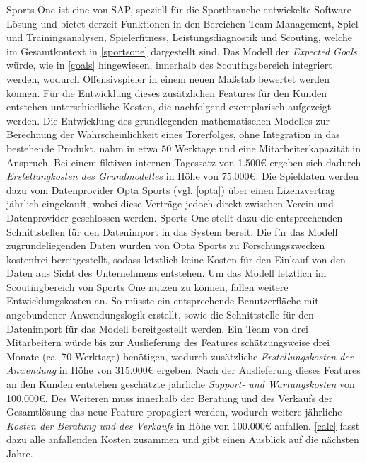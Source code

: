 Sports One ist eine von SAP, speziell für die Sportbranche entwickelte Software-Lösung und bietet derzeit Funktionen in den Bereichen Team Management, Spiel- und Trainingsanalysen, Spielerfitness, Leistungsdiagnostik und Scouting, welche im Gesamtkontext in \vref{sportsone} dargestellt sind. Das Modell der \textit{Expected Goals} würde, wie in \vref{goals} hingewiesen, innerhalb des Scoutingsbereich integriert werden, wodurch Offensivspieler in einem neuen Maßstab bewertet werden können. Für die Entwicklung dieses zusätzlichen Features für den Kunden entstehen unterschiedliche Kosten, die nachfolgend exemplarisch aufgezeigt werden. Die Entwicklung des grundlegenden mathematischen Modelles zur Berechnung der Wahrscheinlichkeit eines Torerfolges, ohne Integration in das bestehende Produkt, nahm in etwa 50 Werktage und eine Mitarbeiterkapazität in Anspruch. Bei einem fiktiven internen Tagessatz von \textsf{1.500\euro} ergeben sich dadurch \textit{Erstellungkosten des Grundmodelles} in Höhe von \textsf{75.000\euro}. Die Spieldaten werden dazu vom Datenprovider Opta Sports (vgl. \vref{opta}) über einen Lizenzvertrag jährlich eingekauft, wobei diese Verträge jedoch direkt zwischen Verein und Datenprovider geschlossen werden. Sports One stellt dazu die entsprechenden Schnittstellen für den Datenimport in das System bereit. Die für das Modell zugrundeliegenden Daten wurden von Opta Sports zu Forschungszwecken kostenfrei bereitgestellt, sodass letztlich keine Kosten für den Einkauf von den Daten aus Sicht des Unternehmens entstehen. Um das Modell letztlich im Scoutingbereich von Sports One nutzen zu können, fallen weitere Entwicklungskosten an. So müsste ein entsprechende Benutzerfläche mit angebundener Anwendungslogik erstellt, sowie die Schnittstelle für den Datenimport für das Modell bereitgestellt werden. Ein Team von drei Mitarbeitern würde bis zur Auslieferung des Features schätzungsweise drei Monate (ca. 70 Werktage) benötigen, wodurch zusätzliche \textit{Erstellungskosten der Anwendung} in Höhe von \textsf{315.000\euro} ergeben. Nach der Auslieferung dieses Features an den Kunden entstehen geschätzte jährliche \textit{Support- und Wartungskosten} von \textsf{100.000\euro}. Des Weiteren muss innerhalb der Beratung und des Verkaufs der Gesamtlösung das neue Feature propagiert werden, wodurch weitere jährliche \textit{Kosten der Beratung und des Verkaufs} in Höhe von \textsf{100.000\euro} anfallen. \vref{calc} fasst dazu alle anfallenden Kosten zusammen und gibt einen Ausblick auf die nächsten Jahre.

